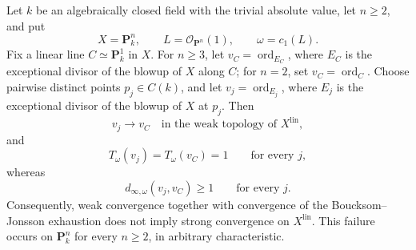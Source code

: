 \begin{theorem}
Let \(k\) be an algebraically closed field with the trivial absolute value,
let \(n\geq2\), and put
\[
             X=\mathbf P^n_k,
             \qquad L=\mathcal O_{\mathbf P^n}(1),
             \qquad \omega=c_1(L).
\]
Fix a linear line \(C\simeq\mathbf P^1_k\) in \(X\).  For \(n\geq3\),
let \(v_C=\operatorname{ord}_{E_C}\), where \(E_C\) is the exceptional
divisor of the blowup of \(X\) along \(C\); for \(n=2\), set
\(v_C=\operatorname{ord}_C\).  Choose pairwise distinct points
\(p_j\in C(k)\), and let
\(v_j=\operatorname{ord}_{E_j}\), where \(E_j\) is the exceptional divisor
of the blowup of \(X\) at \(p_j\).  Then
\[
              v_j\longrightarrow v_C
              \quad\text{in the weak topology of }X^{\mathrm{lin}},
\]
and
\[
              T_\omega(v_j)=T_\omega(v_C)=1
              \qquad\text{for every }j,
\]
whereas
\[
              d_{\infty,\omega}(v_j,v_C)\geq1
              \qquad\text{for every }j.
\]
Consequently, weak convergence together with convergence of the
Boucksom--Jonsson exhaustion does not imply strong convergence on
\(X^{\mathrm{lin}}\).  This failure occurs on \(\mathbf P^n_k\) for every
\(n\geq2\), in arbitrary characteristic.
\end{theorem}
